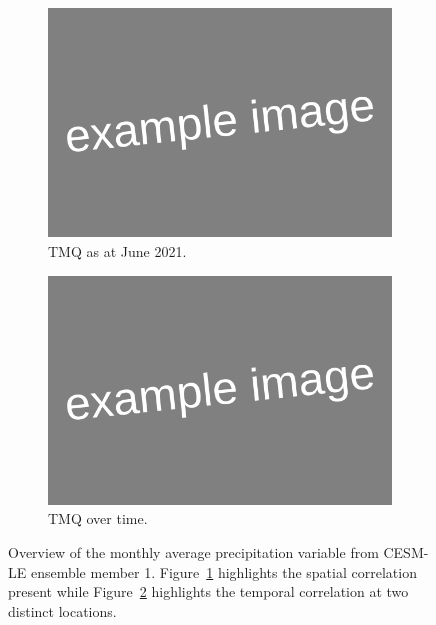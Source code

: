 \begin{figure}[htbp!] 
	\centering
	\begin{subfigure}[b]{0.45\textwidth}
		\includegraphics[width=\textwidth]{Example_image}
		\caption{TMQ as at June 2021.}
		\label{fig:precip_june}   
	\end{subfigure}             
	\begin{subfigure}[b]{0.45\textwidth}
		\includegraphics[width=\textwidth]{Example_image}
		\caption{TMQ over time.}
		\label{fig:precip_temp}
	\end{subfigure}             
	\caption[Overview of Precipitation variable]{Overview of the monthly average precipitation variable from CESM-LE ensemble member 1. Figure~\ref{fig:precip_june} highlights the spatial correlation present while Figure~\ref{fig:precip_temp} highlights the temporal correlation at two distinct locations.}
	\label{fig:precip_overview}
\end{figure}


